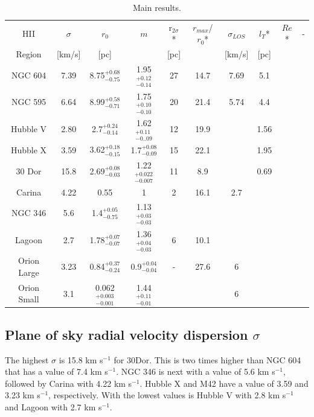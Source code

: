 \documentclass[fleqn,usenatbib, useAMS, a4paper]{mnras}
\begin{document}
\begin{table}
\begin{center}\caption{Main results.}
\begin{tabular}{cccccccccc}\hline
HII    &  \(\sigma\) &   \(r_0\) &    \(m\)   & r$_{2\sigma}$* &  \(r_{max}\)/\(r_0\)* & \(\sigma_{LOS}\)& \(l_T\)* & \(Re\)*& - \\
Region    &  [km/s] &  [pc]    &        & [pc] &      &[km/s]& [pc] & &  \\ \hline
NGC 604   &  7.39   &  8.75\(^{+0.68}_{-0.75}\)    &   1.95\(^{+0.12}_{-0.14}\)  & 27   & 14.7 & 7.69 &  5.1 & &  \\
NGC 595   &  6.64   &  8.99\(^{+0.58}_{-0.71}\)    &   1.75\(^{+0.10}_{-0.10}\) & 20   & 21.4 & 5.74 & 4.4  & &  \\
Hubble V  &  2.80   &  2.7\(^{+0.24}_{-0.14}\)   &   1.62\(^{+0.11}_{-0..09}\)  & 12   & 19.9 &      & 1.56 & &  \\ 
Hubble X  &  3.59   &  3.62\(^{+0.18}_{-0.15}\)    &   1.7\(^{+0.08}_{-0.09}\) & 15   & 22.1 &      & 1.95 & &  \\   
30 Dor    &  15.8    &   2.69\(^{+0.08}_{-0.03}\)    &   1.22\(^{+0.022}_{-0.007}\) & 11   & 8.9  &      & 0.69 & &  \\
Carina    &  4.22    &   0.55    &    1   & 2    & 16.1 & 2.7  &      & &  \\
NGC 346   &   5.6    &  1.4\(^{+0.05}_{-0.75}\)     &    1.13\(^{+0.03}_{-0.03}\) &     &     &     &  & &  \\
Lagoon    &  2.7     &   1.78\(^{+0.07}_{-0.07}\)     &   1.36\(^{+0.04}_{-0.03}\) &  6   & 10.1 &      &      & &  \\ 
Orion Large &  3.23    &   0.84\(^{+0.37}_{-0.24}\)    &   0.9\(^{+0.04}_{-0.04}\) &  -   & 27.6 &   6  &      & &  \\
Orion Small &   3.1 & 0.062\(^{+0.003}_{-0.001}\)      &  1.44\(^{+0.11}_{-0.01}\)  &     &  &  6   &      &  & \\	  

\end{tabular}\label{tab:Res}
\end{center}
\end{table}  
  
\subsection{Plane of sky radial velocity dispersion \(\sigma\)}

The highest \(\sigma\) is 15.8 km s\(^{-1}\) for 30Dor.
This is two times higher than NGC 604 that has a value of 7.4 km s\(^{-1}\).
NGC 346 is next with a value of 5.6 km s\(^{-1}\), followed by Carina with 4.22 km s\(^{-1}\).
Hubble X and M42 have a value of 3.59 and 3.23 km s\(^{-1}\), respectively.
With the lowest values is Hubble V with 2.8 km s\(^{-1}\) and Lagoon with 2.7 km s\(^{-1}\).
\end{document}
